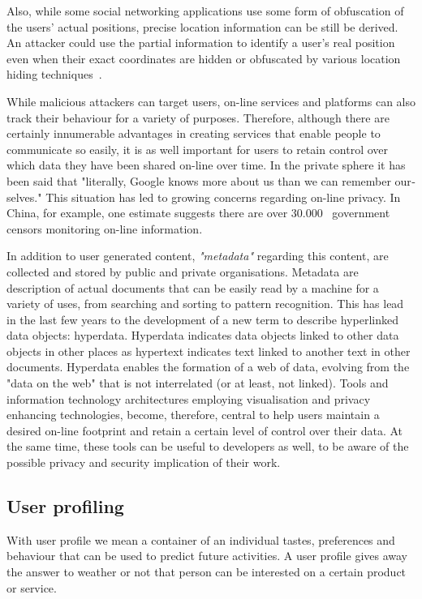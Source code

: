 Also, while some social networking applications use some form of obfuscation of the users' actual positions, precise location information can be still be derived. An attacker 
could use the partial information to identify a user's real position even when their exact coordinates are hidden or obfuscated  by  various  location  hiding  techniques~\cite{li2014all}.

While malicious attackers can target users, on-line services and platforms can also track their behaviour for a variety of purposes. Therefore, although there are certainly innumerable advantages in creating services that enable people to communicate so easily, it is as well important for users to retain control over which data they have been shared on-line over time. In the private sphere it has been said that "literally, Google knows more about us than we can remember our­selves." This situation has led to growing concerns regarding on-line privacy. In China, for example, one estimate suggests there are over 30.000~\cite{internet-freedom} government censors monitoring on-line information.

In addition to user generated content, \emph{"meta­data"} regarding this content, are collected and stored by public and private organisations. Meta­data are description of actual documents that can be easily read by a machine for a variety of uses, from searching and sorting to pattern recognition. This has lead in the last few years to the development of a new term to describe hyperlinked data objects: hyperdata. Hyperdata indicates data objects linked to other data objects in other places as hypertext indicates text linked to another text in other documents. Hyperdata enables the formation of a web of data, evolving from the "data on the web" that is not interrelated (or at least, not linked). Tools and information technology architectures employing visualisation and privacy enhancing technologies, become, therefore, central to help users maintain a desired on-line footprint and retain a certain level of control over their data. At the same time, these tools can be useful to developers as well, to be aware of the possible privacy and security implication of their work.

\subsection{User profiling}

With user profile we mean a container of an individual tastes, preferences and behaviour that can be used to predict future activities. A user profile gives away the answer to weather or not that person can be interested on a certain product or service.

